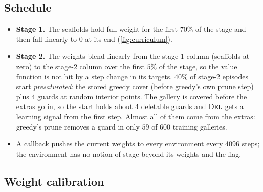 \documentclass[11pt,a4paper]{article}
\begin{document}
\subsection{Schedule}\label{sec:schedule}

\begin{itemize}
  \item \textbf{Stage 1.} The scaffolds hold full weight for the first $70\%$ of the stage
        and then fall linearly to $0$ at its end (\cref{fig:curriculum}).
  \item \textbf{Stage 2.} The weights blend linearly from the stage-1 column (scaffolds at
        zero) to the stage-2 column over the first $5\%$ of the stage, so the value function
        is not hit by a step change in its targets. $40\%$ of stage-2 episodes start
        \emph{presaturated}: the stored greedy cover (before greedy's own prune step) plus
        $4$ guards at random interior points. The gallery is covered before the extras go in,
        so the start holds about $4$ deletable guards and $\textsc{Del}$ gets a learning signal from the
        first step. Almost all of them come from the extras: greedy's prune removes a guard in
        only $59$ of $600$ training galleries.
  \item A callback pushes the current weights to every environment every 4096 steps; the
        environment has no notion of stage beyond its weights and the 
        flag.
\end{itemize}

\subsection{Weight calibration}\label{sec:calib}
\end{document}

